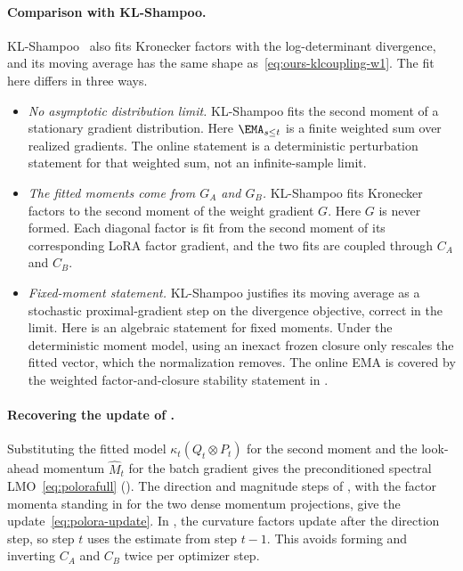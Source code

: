 \paragraph{Comparison with KL-Shampoo.} KL-Shampoo~\cite{klshampoo} also
fits Kronecker factors with the log-determinant divergence, and its moving
average has the same shape as~\eqref{eq:ours-klcoupling-w1}. The fit here
differs in three ways.
\begin{itemize}[leftmargin=1.5em,itemsep=1pt,topsep=2pt]
  \item \emph{No asymptotic distribution limit.} KL-Shampoo fits the second
  moment of a stationary gradient distribution. Here $\EMA_{s \leq t}$ is a
  finite weighted sum over realized gradients. The online statement is a
  deterministic perturbation statement for that weighted sum, not an
  infinite-sample limit.
  \item \emph{The fitted moments come from $G_A$ and $G_B$.} KL-Shampoo
  fits Kronecker factors to the second moment of the weight gradient $G$.
  Here $G$ is never formed. Each diagonal factor is fit from the second
  moment of its corresponding LoRA factor gradient, and the two fits are
  coupled through $C_A$ and $C_B$.
  \item \emph{Fixed-moment statement.} KL-Shampoo
  justifies its moving average as a stochastic proximal-gradient step on
  the divergence objective, correct in the limit. Here
   is an algebraic statement for fixed moments.
  Under the deterministic moment model, using an inexact frozen
  closure only rescales the fitted vector, which the normalization removes.
  The online EMA is covered by the weighted factor-and-closure stability
  statement in .
\end{itemize}

\paragraph{Recovering the update of .} Substituting the
fitted model $\kappa_t(Q_t\otimes P_t)$ for the second moment and the
look-ahead momentum $\widehat M_t$ for the batch gradient gives the
preconditioned spectral LMO~\eqref{eq:polorafull}
(). The direction and magnitude steps of
, with the factor momenta standing in for the two
dense momentum projections, give the update~\eqref{eq:polora-update}. In
, the curvature factors update after the direction step, so
step $t$ uses the estimate from step $t-1$. This avoids forming and
inverting $C_A$ and $C_B$ twice per optimizer step.

